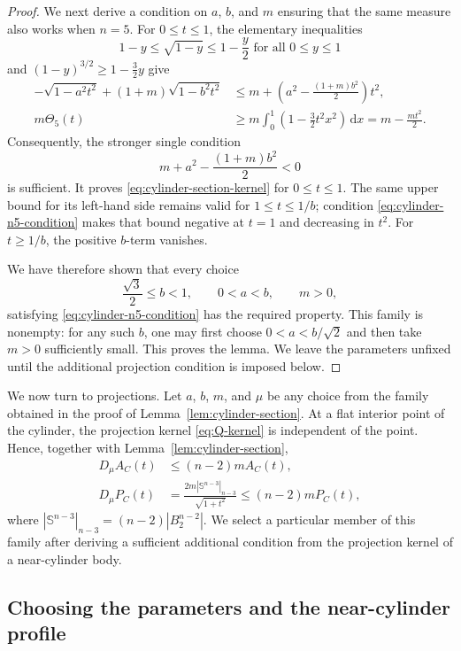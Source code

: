 \documentclass[11pt]{article}
\theoremstyle{remark}
\newcommand{\Sph}{\mathbb{S}}
\newcommand{\dd}{\,\mathrm{d}}
\begin{document}
\begin{proof}
We next derive a condition on $a$, $b$, and $m$ ensuring that the same
measure also works when $n=5$.  For $0\leq t\leq1$, the elementary inequalities
\[
 1-y\leq\sqrt{1-y}\leq1-\frac y2
 \mbox{ for all } 0\leq y\leq1
\]
and $(1-y)^{3/2}\geq1-\frac32y$ give
\begin{align*}
 -\sqrt{1-a^2t^2}+(1+m)\sqrt{1-b^2t^2}
 &\leq m+
 \left(a^2-\frac{(1+m)b^2}{2}\right)t^2,\\
 m\Theta_5(t)
 &\geq m\int_0^1
 \left(1-\frac32t^2x^2\right)\dd x
 =m-\frac{mt^2}{2}.
\end{align*}
Consequently, the stronger single condition
\begin{equation}\label{eq:cylinder-n5-condition}
 m+a^2-\frac{(1+m)b^2}{2}<0
\end{equation}
is sufficient.  It proves
\eqref{eq:cylinder-section-kernel} for
$0\leq t\leq1$.  The same upper bound for its left-hand side remains valid
for $1\leq t\leq1/b$; condition
\eqref{eq:cylinder-n5-condition} makes that bound negative at $t=1$ and
decreasing in $t^2$.  For $t\geq1/b$, the positive $b$-term vanishes.

We have therefore shown that every choice
\[
 \frac{\sqrt3}{2}\leq b<1,\qquad 0<a<b,\qquad m>0,
\]
satisfying \eqref{eq:cylinder-n5-condition} has the required property.  This
family is nonempty: for any such $b$, one may first choose
$0<a<b/\sqrt2$ and then take $m>0$ sufficiently small.  This proves the
lemma.  We leave the parameters unfixed until the additional projection
condition is imposed below.
\end{proof}
We now turn to projections.  Let $a$, $b$, $m$, and $\mu$ be any choice
from the family obtained in the proof of
Lemma~\ref{lem:cylinder-section}.  At a flat interior point of the
cylinder, the projection kernel \eqref{eq:Q-kernel} is independent of the
point.  Hence, together with Lemma~\ref{lem:cylinder-section},
\[
 \begin{aligned}
 D_\mu A_C(t)
 &\leq(n-2)mA_C(t),\\
 D_\mu P_C(t)
 &=\frac{2m|\Sph^{n-3}|_{n-3}}{\sqrt{1+t^2}}
 \leq(n-2)mP_C(t),
 \end{aligned}
\]
where $
 |\Sph^{n-3}|_{n-3}=(n-2)|B_2^{n-2}|$. 
We select a particular member of this family after deriving a sufficient
additional condition from the projection kernel of a near-cylinder body.






\subsection{Choosing the parameters and the near-cylinder profile}
\end{document}
